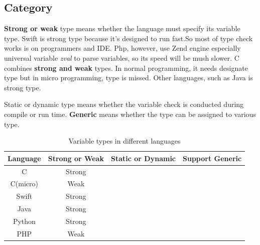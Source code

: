\documentclass[12pt, a4paper]{report}
\begin{document}
    \subsection{Category}
    \textbf{Strong or weak} type means whether the language must specify its variable type. Swift is strong type because it’s designed to run fast.So most of type check works is on programmers and IDE. Php, however, use Zend engine especially universal variable \emph{zval} to parse variables, so its speed will be mush slower. C combines \textbf{strong and weak} types. In normal programming, it needs designate type but in micro programming, type is missed. Other languages, such as Java is strong type.\par 
    Static or dynamic type means whether the variable check is conducted during compile or run time.
    \textbf{Generic} means whether the type can be assigned to various type. \par
    \begin{table}[H]
        \centering
        \begin{tabular}{c|c|c|c}
             \toprule
             Language & Strong or Weak & Static or Dynamic & Support Generic \\
             \hline
             C & Strong & & \\
             \hline
             C(micro) & Weak && \\
             \hline
             Swift & Strong  &&\\
             \hline
             Java & Strong  &&\\
             \hline
             Python & Strong && \\
             \hline
             PHP & Weak && \\
             \bottomrule
        \end{tabular}
        \caption{Variable types in different languages}
        \label{tab:my_label}
    \end{table}
\end{document}
